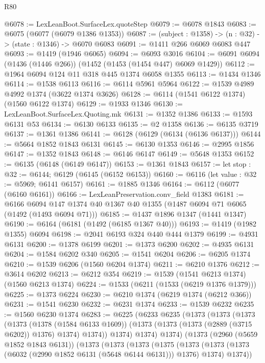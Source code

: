 \begin{lexlean}{R80}
\begin{coremodule}
@6078 := LexLeanBoot.SurfaceLex.quoteStep
@6079 := @6078 @1843
@6083 := @6075 (@6077 (@6079 @1386 @1353))
@6087 := (subject : @1358) -> (n : @32) -> (state : @1346) -> @6070 @6083
@6091 := @1411 @266 @6069 @6083 @447
@6093 := @1419 (@1946 @6065)
@6094 := @6093 @3016
@6104 := @6091 @6094 (@1436 (@1446 @266)) (@1452 (@1453 (@1454 @447) @6069 @1429))
@6112 := @1964 @6094 @124 @11 @318 @445 @1374 @6058 @1355
@6113 := @1434 @1346
@6114 := @1538 @6113
@6116 := @6114 @5961 @5964
@6122 := @1539 @4989 @4992 @1374 (@3622 @1374 @3626)
@6128 := @6114 (@1541 @6122 @1374) (@1560 @6122 @1374)
@6129 := @1933 @1346
@6130 := LexLeanBoot.SurfaceLex.Quoting.mk
@6131 := @1352 @1386
@6133 := @1593 @6131 @53
@6134 := @6130 @6133
@6135 := @2 @1358
@6136 := @6135 @3719
@6137 := @1361 @1386
@6141 := @6128 (@6129 (@6134 (@6136 @6137)))
@6144 := @5664 @1852 @1843 @6131
@6145 := @6130 @1353
@6146 := @2995 @1856
@6147 := @1352 @1843
@6148 := @6146 @6147
@6149 := @5648 @1353
@6152 := @6135 (@6148 (@6149 @6147))
@6153 := @1361 @1843
@6157 := let stop : @32 := @6144; @6129 (@6145 (@6152 @6153))
@6160 := @6116 (let value : @32 := @5969; @6141 @6157)
@6161 := @1885 @1346
@6164 := @6112 (@6077 (@6160 @6161))
@6166 := LexLeanPreservation.conv_field @1383
@6181 := @6166
    @6094
    @147
    @1374
    @40
    @1367
    @40
    @1355
    (@1487 @6094 @71 @6065 (@1492 (@1493 @6094 @71)))
@6185 := @1437 @1896 @1347 (@1441 @1347)
@6190 := @6164 (@6181 (@1492 (@6185 @1367 @40)))
@6193 := @1419 (@1982 @1355) @6094
@6198 := @2041 @6193 @324 @440 @444 @1379
@6199 := @4931 @6131
@6200 := @1378 @6199
@6201 := @1373 @6200
@6202 := @4935 @6131
@6204 := @1584 @6202 @340
@6205 := @1541 @6204
@6206 := @6205 @1374
@6210 := @1539 @6206 (@1560 @6204 @1374)
@6211 := @6210 @1376
@6212 := @3614 @6202
@6213 := @6212 @354
@6219 := @1539 (@1541 @6213 @1374) (@1560 @6213 @1374)
@6224 := @1533 (@6211 (@1533 (@6219 @1376 @1379)))
@6225 := @1373 @6224
@6230 := @6210 @1374 (@6219 @1374 (@6212 @366))
@6231 := @1541 @6230
@6232 := @6231 @1374
@6233 := @1539 @6232
@6235 := @1560 @6230 @1374
@6283 := @6225
    (@6233
      @6235
      (@1373
        (@1373
          (@1373
            (@1373
              (@1378 (@1584 @6133 @1609))
              (@1373 (@1373 (@1373 (@2889 (@3715 @6202)) @1376) @1374) @1374))
            @1374)
          @1374)
        @1374)
      (@1373
        (@2960 (@5659 @1852 @1843 @6131))
        (@1373
          (@1373
            (@1373
              (@1375
                (@1373
                  (@1373 (@1373 (@6032 (@2990 @1852 @6131 (@5648 @6144 @6131))) @1376) @1374)
                  @1374))

\end{coremodule}
\end{lexlean}
